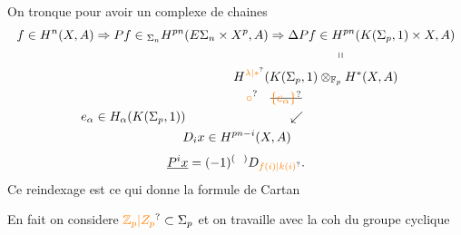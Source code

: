 
On tronque pour avoir un complexe de chaines
\[
\begin{aligned}
f\in H^n(X,A)&\Rightarrow Pf\in{}_{\Sigma_n}H^{pn}(E\Sigma_n\times X^p,A)
\Rightarrow\Delta Pf\in H^{pn}(K(\Sigma_p,1)\times X,A)\\
&\hspace{19em}\shortparallel\\
&\hspace{11em}H^{\unsure{\lambda|*}}(K(\Sigma_p,1)\otimes_{\mathbb F_p}H^*(X,A)\\
&\hspace{12em}\unsure{\circ}\quad\deleted{\unsure{\{e_\alpha\}}}\\
e_\alpha&\in H_{\alpha}(K(\Sigma_p,1))\hspace{8em}\swarrow\\
&\hspace{7em}D_i x\in H^{pn-i}(X,A)
\end{aligned}
\]
\[
\underline{P^i x}=(-1)^{(\ \ )}D_{\unsure{f(i)|k(i)}}.
\]
Ce reindexage est ce qui donne la formule de Cartan

En fait on considere \(\unsure{\mathbb Z_p|Z_p}\subset\Sigma_p\) et on travaille avec la coh du groupe cyclique
